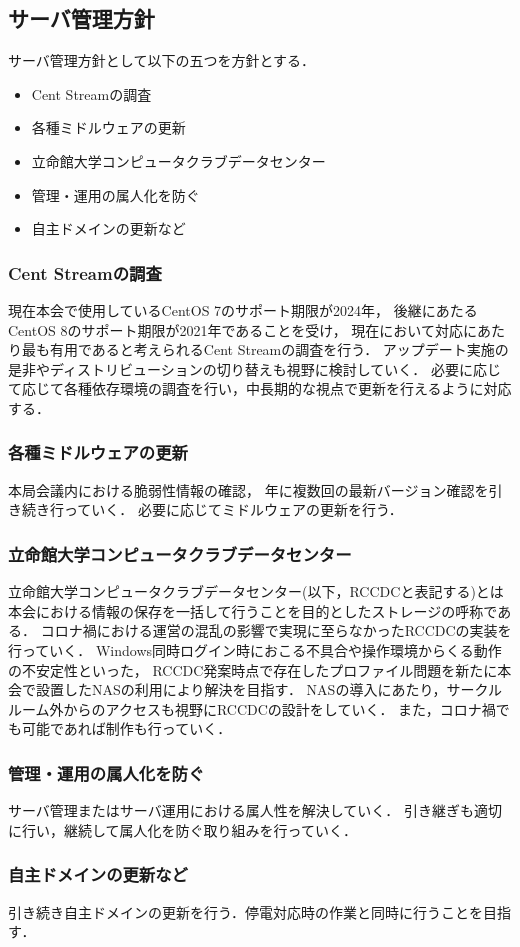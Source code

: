 \subsection*{サーバ管理方針}


サーバ管理方針として以下の五つを方針とする．
\begin{itemize}
    \item Cent Streamの調査
    \item 各種ミドルウェアの更新
    \item 立命館大学コンピュータクラブデータセンター
    \item 管理・運用の属人化を防ぐ
    \item 自主ドメインの更新など
\end{itemize}

\subsubsection*{Cent Streamの調査}
現在本会で使用しているCentOS 7のサポート期限が2024年，
後継にあたるCentOS 8のサポート期限が2021年であることを受け，
現在において対応にあたり最も有用であると考えられるCent Streamの調査を行う．
アップデート実施の是非やディストリビューションの切り替えも視野に検討していく．
必要に応じて応じて各種依存環境の調査を行い，中長期的な視点で更新を行えるように対応する．

\subsubsection*{各種ミドルウェアの更新}
本局会議内における脆弱性情報の確認，
年に複数回の最新バージョン確認を引き続き行っていく．
必要に応じてミドルウェアの更新を行う．

\subsubsection*{立命館大学コンピュータクラブデータセンター}
立命館大学コンピュータクラブデータセンター(以下，RCCDCと表記する)とは本会における情報の保存を一括して行うことを目的としたストレージの呼称である．
コロナ禍における運営の混乱の影響で実現に至らなかったRCCDCの実装を行っていく．
Windows同時ログイン時におこる不具合や操作環境からくる動作の不安定性といった，
RCCDC発案時点で存在したプロファイル問題を新たに本会で設置したNASの利用により解決を目指す．
NASの導入にあたり，サークルルーム外からのアクセスも視野にRCCDCの設計をしていく．
また，コロナ禍でも可能であれば制作も行っていく．

\subsubsection*{管理・運用の属人化を防ぐ}
サーバ管理またはサーバ運用における属人性を解決していく．
引き継ぎも適切に行い，継続して属人化を防ぐ取り組みを行っていく．

\subsubsection*{自主ドメインの更新など}
引き続き自主ドメインの更新を行う．停電対応時の作業と同時に行うことを目指す．
